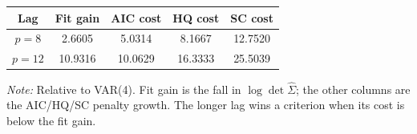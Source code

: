 \begin{table}[htpb]
    \centering
    \scriptsize
    \begin{tabular}{ccccc}
    \toprule
    \textbf{Lag} & \textbf{Fit gain} & \textbf{AIC cost} & \textbf{HQ cost} & \textbf{SC cost} \\
    \midrule
    $p = 8$ & 2.6605 & 5.0314 & 8.1667 & 12.7520 \\
    $p = 12$ & 10.9316 & 10.0629 & 16.3333 & 25.5039 \\
    \bottomrule
    \end{tabular}

    \vspace{0.15cm}
    \raggedright
    \tiny{\textit{Note:} Relative to VAR(4). Fit gain is the fall in $\log\det\hat{\Sigma}$; the other columns are the AIC/HQ/SC penalty growth. The longer lag wins a criterion when its cost is below the fit gain.}
\end{table}
